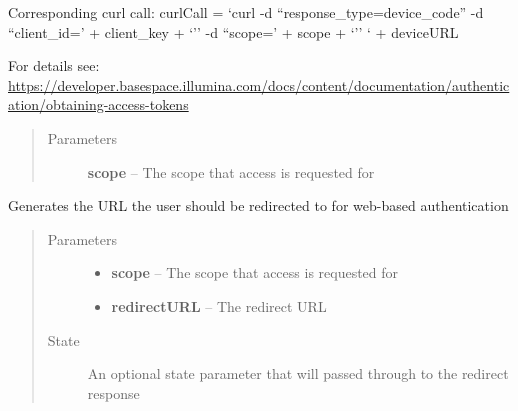 \documentclass[letterpaper,10pt,english]{sphinxmanual}
\begin{document}
\begin{fulllineitems}
\begin{fulllineitems}
Corresponding curl call:
curlCall = `curl -d ``response\_type=device\_code'' -d ``client\_id=' + client\_key + `'' -d ``scope=' + scope + `'' ` + deviceURL

For details see:
\href{https://developer.basespace.illumina.com/docs/content/documentation/authentication/obtaining-access-tokens}{https://developer.basespace.illumina.com/docs/content/documentation/authentication/obtaining-access-tokens}
\begin{quote}\begin{description}
\item[{Parameters}] \leavevmode
\textbf{scope} -- The scope that access is requested for

\end{description}\end{quote}

\end{fulllineitems}


\begin{fulllineitems}
\label{Available modules:BaseSpacePy.api.BaseSpaceAPI.BaseSpaceAPI.getWebVerificationCode}
Generates the URL the user should be redirected to for web-based authentication
\begin{quote}\begin{description}
\item[{Parameters}] \leavevmode\begin{itemize}
\item {} 
\textbf{scope} -- The scope that access is requested for

\item {} 
\textbf{redirectURL} -- The redirect URL

\end{itemize}

\item[{State }] \leavevmode
An optional state parameter that will passed through to the redirect response

\end{description}\end{quote}

\end{fulllineitems}



\end{fulllineitems}
\end{document}
